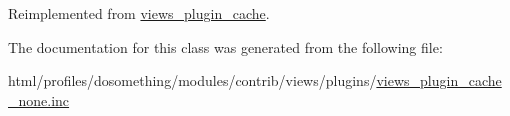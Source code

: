Reimplemented from \hyperlink{classviews__plugin__cache_a35e5232e39c8148476328e302787d16b}{views\_\-plugin\_\-cache}.

The documentation for this class was generated from the following file:\begin{DoxyCompactItemize}
\item 
html/profiles/dosomething/modules/contrib/views/plugins/\hyperlink{views__plugin__cache__none_8inc}{views\_\-plugin\_\-cache\_\-none.inc}\end{DoxyCompactItemize}
